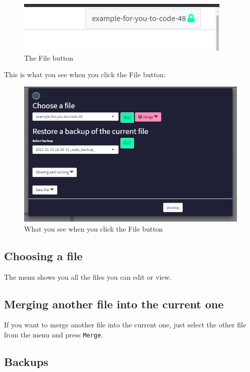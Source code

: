 \documentclass[
]{book}
\begin{document}
\begin{figure}
\centering
\includegraphics{_assets/110004.png}
\caption{The File button}
\end{figure}

This is what you see when you click the File button:

\begin{figure}
\centering
\includegraphics{_assets/110000.png}
\caption{What you see when you click the File button}
\end{figure}

\hypertarget{choosing-a-file}{%
\subsection{Choosing a file}\label{choosing-a-file}}

The menu shows you all the files you can edit or view.

\hypertarget{merging-another-file-into-the-current-one}{%
\subsection{Merging another file into the current one}\label{merging-another-file-into-the-current-one}}

If you want to merge another file into the current one, just select the other file from the menu and press \texttt{Merge}.

\hypertarget{backups}{%
\subsection{Backups}\label{backups}}
\end{document}
